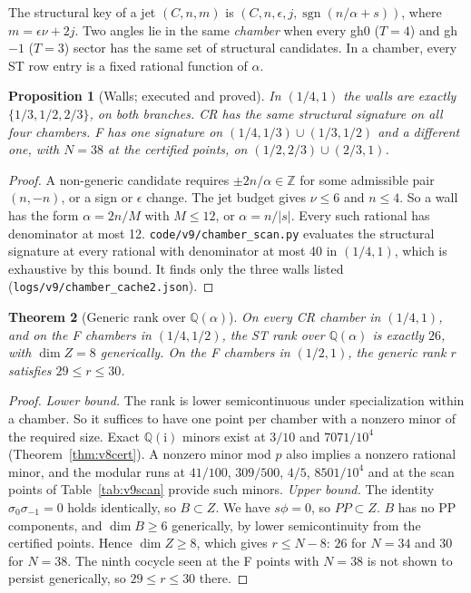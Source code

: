 \documentclass[11pt,a4paper]{article}
\newcommand{\ii}{\mathrm i}
\newcommand{\loc}[1]{\nolinkurl{#1}}
\theoremstyle{plain}
\newtheorem{theorem}{Theorem}[section]
\newtheorem{proposition}[theorem]{Proposition}
\theoremstyle{definition}
\theoremstyle{remark}
\numberwithin{equation}{section}
\begin{document}
The structural key of a jet \((C,n,m)\) is
\((C,n,\epsilon,j,\operatorname{sgn}(n/\alpha+s))\), where
\(m=\epsilon\nu+2j\). Two angles lie in the same \emph{chamber} when
every gh0 (\(T=4\)) and gh\(-1\) (\(T=3\)) sector has the same set
of structural candidates. In a chamber, every ST row entry is a
fixed rational function of \(\alpha\).

\begin{proposition}[Walls; executed and proved]
\label{prop:v9walls}
In \((1/4,1)\) the walls are exactly \(\{1/3,1/2,2/3\}\), on both
branches. CR has the same structural signature on all four
chambers. F has one signature on \((1/4,1/3)\cup(1/3,1/2)\) and a
different one, with \(N=38\) at the certified points, on
\((1/2,2/3)\cup(2/3,1)\).
\end{proposition}

\begin{proof}
A non-generic candidate requires \(\pm2n/\alpha\in\mathbb Z\) for
some admissible pair \((n,-n)\), or a sign or \(\epsilon\) change.
The jet budget gives \(\nu\le6\) and \(n\le4\). So a wall has the
form \(\alpha=2n/M\) with \(M\le12\), or \(\alpha=n/|s|\). Every
such rational has denominator at most 12.
\loc{code/v9/chamber_scan.py} evaluates the structural signature
at every rational with denominator at most 40 in \((1/4,1)\),
which is exhaustive by this bound. It finds only the three walls
listed (\loc{logs/v9/chamber_cache2.json}).
\end{proof}

\begin{theorem}[Generic rank over \(\mathbb Q(\alpha)\)]
\label{thm:v9generic}
On every CR chamber in \((1/4,1)\), and on the F chambers in
\((1/4,1/2)\), the ST rank over \(\mathbb Q(\alpha)\) is exactly
\(26\), with \(\dim Z=8\) generically. On the F chambers in
\((1/2,1)\), the generic rank \(r\) satisfies \(29\le r\le30\).
\end{theorem}

\begin{proof}
\emph{Lower bound.} The rank is lower semicontinuous under
specialization within a chamber. So it suffices to have one point
per chamber with a nonzero minor of the required size. Exact
\(\mathbb Q(\ii)\) minors exist at \(3/10\) and \(7071/10^4\)
(Theorem~\ref{thm:v8cert}). A nonzero minor mod \(p\) also implies
a nonzero rational minor, and the modular runs at \(41/100\),
\(309/500\), \(4/5\), \(8501/10^4\) and at the scan points of
Table~\ref{tab:v9scan} provide such minors.
\emph{Upper bound.} The identity \(\sigma_0\sigma_{-1}=0\) holds
identically, so \(B\subset Z\). We have \(s\phi=0\), so \(PP\subset Z\).
\(B\) has no PP components, and \(\dim B\ge6\) generically, by lower
semicontinuity from the certified points. Hence \(\dim Z\ge8\),
which gives \(r\le N-8\): \(26\) for \(N=34\) and \(30\) for
\(N=38\). The ninth cocycle seen at the F points with \(N=38\) is
not shown to persist generically, so \(29\le r\le30\) there.
\end{proof}
\end{document}
